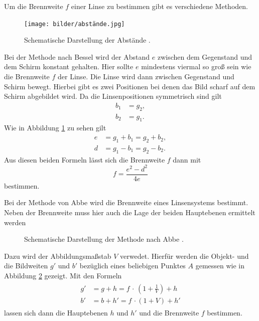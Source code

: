 Um die Brennweite $f$ einer Linse zu bestimmen gibt es verschiedene Methoden.
\begin{figure}
  \texttt{[image: bilder/abstände.jpg]}
  \caption{Schematische Darstellung der Abstände \cite{408}.}
  \label{fig:abs}
\end{figure}
Bei der Methode nach Bessel wird der Abstand $e$ zwischen dem Gegenstand und dem
Schirm konstant gehalten. Hier sollte $e$ mindestens viermal so groß sein wie die
Brennweite $f$ der Linse. Die Linse wird dann zwischen Gegenstand und Schirm
bewegt. Hierbei gibt es zwei Positionen bei denen das Bild scharf auf dem
Schirm abgebildet wird. Da die Linsenpositionen symmetrisch sind gilt
\begin{align*}
  b_1&=g_2, \\
  b_2&=g_1.
\end{align*}
Wie in Abbildung \ref{fig:abs} zu sehen gilt
\begin{align}
  e &= g_1 + b_1 = g_2 + b_2,\\
  d &= g_1 - b_1 = g_2 - b_2.
\end{align}
Aus diesen beiden Formeln lässt sich die Brennweite $f$ dann mit
\begin{equation}
  f = \frac{e^2-d^2}{4e}
\end{equation}
bestimmen.

Bei der Methode von Abbe wird die Brennweite eines Linsensystems bestimmt. Neben
der Brennweite muss hier auch die Lage der beiden Hauptebenen ermittelt werden
\begin{figure}
  \caption{Schematische Darstellung der Methode nach Abbe \cite{408}.}
  \label{fig:abbe}
\end{figure}
Dazu wird der Abbildungsmaßstab $V$ verwedet. Hierfür werden die Objekt- und die
Bildweiten  $g'$ und $b'$ bezüglich eines beliebigen Punktes $A$ gemessen wie in
Abbildung \ref{fig:abbe} gezeigt. Mit den Formeln
\begin{align}
  \begin{split}
    g' &= g + h = f\,\cdot\,\left(1+\frac{1}{V}\right) + h \\
    b' &= b + h'= f\,\cdot(1+V)+h'
    \label{eqn:haupt}
  \end{split}
\end{align}
lassen sich dann die Hauptebenen $h$ und $h'$ und die Brennweite $f$ bestimmen.
